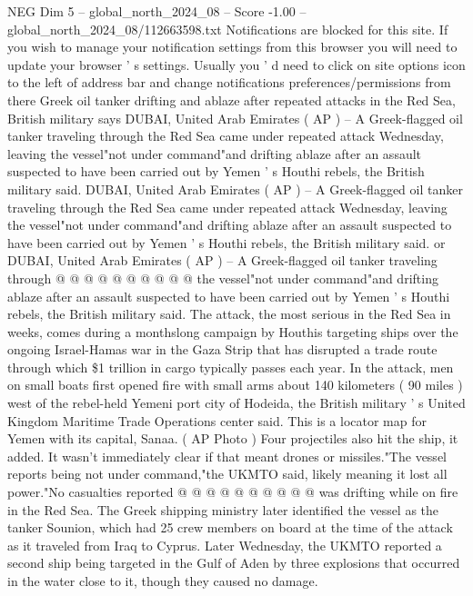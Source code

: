 \begin{textsample}{NEG Dim 5 – global\_north\_2024\_08 – Score -1.00 – global\_north\_2024\_08/112663598.txt}  \label{ex:f5_neg_065}
Notifications are blocked for this site.
If you wish to manage your notification settings from this browser you will need to update your browser ' s settings.
Usually you ' d need to click on site options icon to the left of address bar and change notifications preferences/permissions from there Greek oil tanker drifting and ablaze after repeated attacks in the Red Sea, British military says DUBAI, United Arab Emirates ( AP ) -- A Greek-flagged oil tanker traveling through the Red Sea came under repeated attack Wednesday, leaving the vessel"not under command"and drifting ablaze after an assault suspected to have been carried out by Yemen ' s Houthi rebels, the British military said.
DUBAI, United Arab Emirates ( AP ) -- A Greek-flagged oil tanker traveling through the Red Sea came under repeated attack Wednesday, leaving the vessel"not under command"and drifting ablaze after an assault suspected to have been carried out by Yemen ' s Houthi rebels, the British military said. or DUBAI, United Arab Emirates ( AP ) -- A Greek-flagged oil tanker traveling through @ @ @ @ @ @ @ @ @ @ the vessel"not under command"and drifting ablaze after an assault suspected to have been carried out by Yemen ' s Houthi rebels, the British military said.
The attack, the most serious in the Red Sea in weeks, comes during a monthslong campaign by Houthis targeting ships over the ongoing Israel-Hamas war in the Gaza Strip that has disrupted a trade route through which \$1 trillion in cargo typically passes each year.
In the attack, men on small boats first opened fire with small arms about 140 kilometers ( 90 miles ) west of the rebel-held Yemeni port city of Hodeida, the British military ' s United Kingdom Maritime Trade Operations center said.
This is a locator map for Yemen with its capital, Sanaa. ( AP Photo ) Four projectiles also hit the ship, it added.
It wasn't immediately clear if that meant drones or missiles."The vessel reports being not under command,"the UKMTO said, likely meaning it lost all power."No casualties reported @ @ @ @ @ @ @ @ @ @ was drifting while on fire in the Red Sea.
The Greek shipping ministry later identified the vessel as the tanker Sounion, which had 25 crew members on board at the time of the attack as it traveled from Iraq to Cyprus.
Later Wednesday, the UKMTO reported a second ship being targeted in the Gulf of Aden by three explosions that occurred in the water close to it, though they caused no damage.

\end{textsample}

